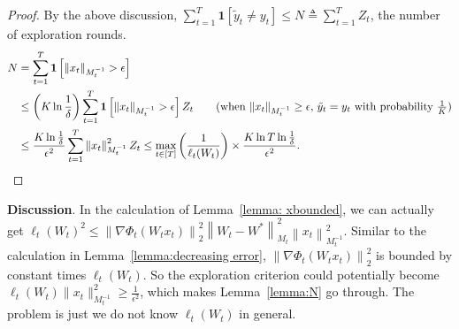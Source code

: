 \documentclass{article}
\newcommand{\one}{\boldsymbol{1}}
\newcommand{\nb}{\nabla}
\newcommand{\norm}[1]{\left\|{#1}\right\|}
\begin{document}
\begin{proof}
By the above discussion, $\sum_{t=1}^T \one[\tilde{y}_t\neq y_t] \leq N\triangleq \sum_{t=1}^T Z_t$, the number of exploration rounds. 
\begin{align*}
    N &= \sum_{t=1}^T \one\left[\norm{x_t}_{M_t^{-1}}> \epsilon\right]\\
    &\leq \left(K\ln \frac{1}{\delta}\right)\sum_{t=1}^T \one\left[\norm{x_t}_{M_t^{-1}}> \epsilon\right]Z_t \tag{when $\|x_t\|_{M_t^{-1}}\geq \epsilon$, $\tilde{y}_t=y_t$ with probability $\frac{1}{K}$} \\
    & \leq \frac{K\ln \frac{1}{\delta}}{\epsilon^2}\sum_{t=1}^T \norm{x_t}_{M_t^{-1}}^2 Z_t \leq \max_{t\in[T]}\left(\frac{1}{\ell_{t}(W_t)}\right)\times \frac{K\ln T\ln \frac{1}{\delta}}{\epsilon^2}. 
\end{align*}
\end{proof}


\textbf{Discussion}. 
In the calculation of Lemma~\ref{lemma: xbounded},  we can actually get $\ell_t(W_t)^2 \leq \norm{\nb\Phi_t(W_tx_t)}_2^2\norm{W_t-W^*}_{M_t}^2\norm{x_t}_{M_t^{-1}}^2$. Similar to the calculation in Lemma~\ref{lemma:decreasing error}, $\norm{\nb\Phi_t(W_tx_t)}_2^2$ is bounded by constant times $\ell_t(W_t)$. So the exploration criterion could potentially become $\ell_t(W_t)\|x_t\|_{M_t^{-1}}^2\geq \frac{1}{\epsilon^2}$, which makes Lemma~\ref{lemma:N} go through. The problem is just we do not know $\ell_t(W_t)$ in general. 







\end{document}
